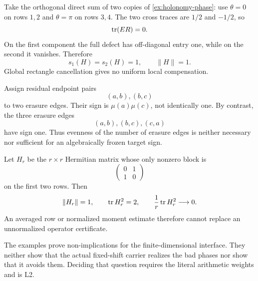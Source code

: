\begin{example}
\label{ex:global-cross-trace-zero}
Take the orthogonal direct sum of two copies of
\cref{ex:holonomy-phase}: use \(\theta=0\) on rows \(1,2\) and
\(\theta=\pi\) on rows \(3,4\).  The two cross traces are \(1/2\) and
\(-1/2\), so
\[
 \operatorname{tr}(ER)=0.
\]
On the first component the full defect has off-diagonal entry one, while
on the second it vanishes.  Therefore
\[
 s_1(H)=s_2(H)=1,\qquad \|H\|=1.
\]
Global rectangle cancellation gives no uniform local compensation.
\end{example}

\begin{example}
\label{ex:E-count-parity}
Assign residual endpoint pairs
\[
 (a,b),(b,c)
\]
to two erasure edges.  Their sign is \(\mu(a)\mu(c)\), not identically one.
By contrast, the three erasure edges
\[
 (a,b),(b,c),(c,a)
\]
have sign one.  Thus evenness of the number of erasure edges is neither
necessary nor sufficient for an algebraically frozen target sign.
\end{example}

\begin{example}
\label{ex:normalized-trace}
Let \(H_r\) be the \(r\times r\) Hermitian matrix whose only nonzero block
is
\[
 \begin{pmatrix}0&1\\1&0\end{pmatrix}
\]
on the first two rows.  Then
\[
 \|H_r\|=1,\qquad
 \operatorname{tr} H_r^2=2,\qquad
 \frac1r\operatorname{tr} H_r^2\longrightarrow0.
\]
An averaged row or normalized moment estimate therefore cannot replace an
unnormalized operator certificate.
\end{example}

\begin{remark}
The examples prove non-implications for the finite-dimensional interface.
They neither show that the actual fixed-shift carrier realizes the bad
phases nor show that it avoids them.  Deciding that question requires the
literal arithmetic weights and is L2.
\end{remark}
